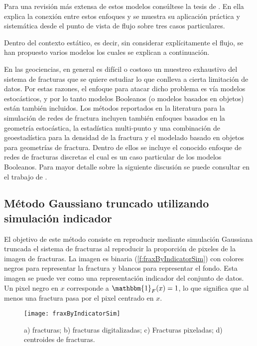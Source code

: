 Para una revisi\'on m\'as extensa de estos modelos cons\'ultese la tesis de \cite{Romano2016}. En ella explica la conexi\'on entre estos enfoques y se muestra su aplicaci\'on pr\'actica y sistem\'atica desde el punto de vista de flujo sobre tres casos particulares.

Dentro del contexto est\'atico, es decir, sin considerar expl\'icitamente el flujo, se han propuesto varios modelos los cuales se explican a continuaci\'on.

En las geociencias, en general es dif\'icil o costoso un muestreo exhaustivo del sistema de fracturas que se quiere estudiar lo que conlleva a cierta limitaci\'on de datos. Por estas razones, el enfoque para atacar dicho problema es v\'ia modelos estoc\'asticos, y por lo tanto modelos Booleanos (o modelos basados en objetos) est\'an tambi\'en incluidos. Los m\'etodos reportados en la literatura para la simulaci\'on de redes de fractura incluyen tambi\'en enfoques basados en la geometr\'ia estoc\'astica, la estad\'istica multi-punto y una combinaci\'on de geoestad\'istica para la densidad de la fractura y el modelado basado en objetos para geometr\'ias de fractura. Dentro de ellos se incluye el conocido enfoque de redes de fracturas discretas el cual es un caso particular de los modelos Booleanos. Para mayor detalle sobre la siguiente discusi\'on se puede consultar en el trabajo de \cite{dowd_comparison_2007}.

\subsection{M\'etodo Gaussiano truncado utilizando simulaci\'on indicador}

El objetivo de este m\'etodo consiste en reproducir mediante simulaci\'on Gaussiana truncada el sistema de fracturas al reproducir la proporci\'on de pixeles de la imagen de fracturas. La imagen es binaria (\autoref{f:fraxByIndicatorSim}) con colores negros para representar la fractura y blancos para representar el fondo. Esta imagen se puede ver como una representaci\'on indicador del conjunto de datos. Un pixel negro en $x$ corresponde a $\mathbbm{1}_{F}(x) = 1$, lo que significa que al menos una fractura pasa por el pixel centrado en $x$.

\begin{figure}
	\centering
	\texttt{[image: fraxByIndicatorSim]}
	\caption{a) fracturas; b) fracturas digitalizadas; c) Fracturas pixeladas; d) centroides de fracturas.}
	\label{f:fraxByIndicatorSim}
\end{figure}

